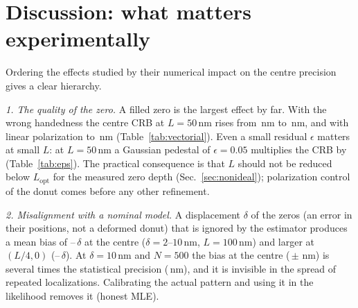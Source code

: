 \section{Discussion: what matters experimentally}\label{sec:discussion}

Ordering the effects studied by their numerical impact on the centre precision gives a clear
hierarchy.

\emph{1. The quality of the zero.} A filled zero is the largest effect by far. With the wrong
handedness the centre CRB at $L=50$\,nm rises from
\,nm to
\,nm, and
with linear polarization to
\,nm
(Table~\ref{tab:vectorial}). Even a small residual $\epsilon$ matters at small $L$: at $L=50$\,nm
a Gaussian pedestal of $\epsilon=0.05$ multiplies the CRB by
(Table~\ref{tab:eps}). The practical consequence is that $L$ should not be reduced below
$L_{\mathrm{opt}}$ for the measured zero depth (Sec.~\ref{sec:nonideal}); polarization control
of the donut \cite{Lopez2023} comes before any other refinement.

\emph{2. Misalignment with a nominal model.} A displacement $\delta$ of the zeros (an error in
their positions, not a deformed donut) that is ignored
by the estimator produces a mean bias of
--$\,\delta$
at the centre ($\delta=2$--$10$\,nm, $L=100$\,nm) and larger at $(L/4,0)$
(--$\,\delta$). At $\delta=10$\,nm and $N=500$ the bias at the centre
(\,$\pm$\,\,nm)
is several times the statistical precision
(\,nm),
and it is invisible in the spread of repeated localizations. Calibrating the actual pattern and
using it in the likelihood removes it (honest MLE).

